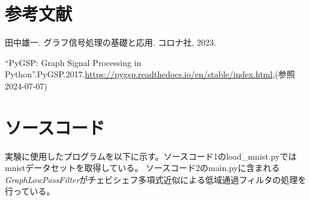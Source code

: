 \newpage
\section{参考文献}

田中雄一. グラフ信号処理の基礎と応用. コロナ社, 2023.

``PyGSP: Graph Signal Processing in Python''.PyGSP.2017.\url{https://pygsp.readthedocs.io/en/stable/index.html},(参照 2024-07-07)

\section{ソースコード}
実験に使用したプログラムを以下に示す。ソースコード1のload\_mnist.pyではmnistデータセットを取得している。
ソースコード2のmain.pyに含まれる{\it GraphLowPassFilter}がチェビシェフ多項式近似による低域通過フィルタの処理を行っている。


\newpage

